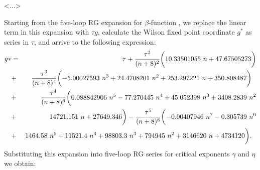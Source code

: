 \documentclass[preprint,preprintnumbers,amsmath,amssymb]{revtex4}
\newcommand{\comment}[1]{} %
\begin{document}
<$\dots$>
\comment{
The critical behavior of two-dimensional systems with $O(n)$-symmetric vector
order parameters is described by Euclidean field theory with the Hamiltonian:
\begin{equation}
\label{model}
H =
\int d^2x \Biggl[{1 \over 2}( m_0^2 \varphi_{\alpha}^2
 + (\nabla \varphi_{\alpha})^2)
+ {\lambda \over 24} (\varphi_{\alpha}^2)^2 \Biggr] ,
\end{equation}
where $\varphi_{\alpha}$ is a real $n$-vector field, bare mass squared $m_0^2$
being proportional to $T - T_c^{(0)}$, $T_c^{(0)}$ -- phase transition temperature
in the absence of order parameter fluctuations. The $\beta$-function and the
critical exponents for the model (1) have been calculated within the massive
theory \cite{OS2000, COPS2004}, with the Green function, the four-point vertex
and the $\phi^2$ insertion normalized in a conventional way:

\begin{eqnarray}
\label{norm}
G_R^{-1} (0, m, g_4) = m^2 , \qquad \quad
{{\partial G_R^{-1} (p, m, g_4)} \over {\partial p^2}}
\bigg\arrowvert_{p^2 = 0} = 1 , \\
\nonumber
\Gamma_R (0, 0, 0, m, g) = m^2 g_4, \qquad \quad
\Gamma_R^{1,2} (0, 0, m, g_4) = 1.
\end{eqnarray}
}
Starting from the five-loop RG expansion for $\beta$-function \cite{OS2000},
we replace the linear term in this expansion with $\tau g$, calculate the
Wilson fixed point coordinate $g^*$ as series in $\tau$, and arrive to the
following expression:
\begin{eqnarray}
\label{g-tau}
g* &=& \tau + {\tau^2 \over (n + 8)^2} \biggl( 10.33501055~n + 47.67505273 \biggr)
\nonumber \\
&+& {\tau^3 \over (n + 8)^4} \biggl(- 5.00027593~n^3 + 24.4708201~n^2 + 253.297221~n
+ 350.808487 \biggr) \ \
\nonumber \\
&+& {\tau^4 \over (n + 8)^6} \biggl( 0.088842906~n^5 - 77.270445~n^4
+ 45.052398~n^3 + 3408.2839~n^2
\nonumber \\
&+& 14721.151~n + 27649.346 \biggr) - {\tau^5 \over (n + 8)^8} \biggl(- 0.00407946~n^7
- 0.305739~n^6
\nonumber \\
&+& 1464.58~n^5 + 11521.4~n^4 + 98803.3~n^3 + 794945~n^2 + 3146620~n + 4734120 \biggr). \ \
\end{eqnarray}
Substituting this expansion into five-loop RG series for critical exponents $\gamma$
and $\eta$ \cite{OS2000, COPS2004} we obtain:
\end{document}
